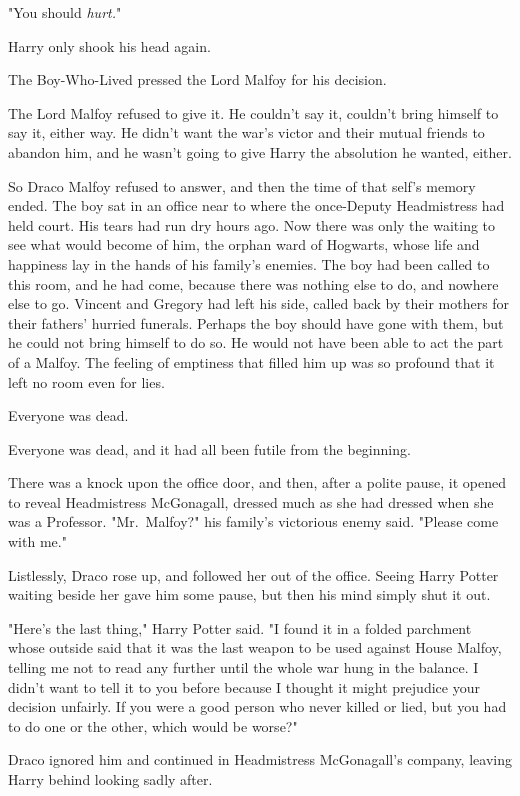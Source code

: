 "You should \emph{hurt.}"

Harry only shook his head again.

The Boy-Who-Lived pressed the Lord Malfoy for his decision.

The Lord Malfoy refused to give it. He couldn't say it, couldn't bring himself
to say it, either way. He didn't want the war's victor and their mutual friends
to abandon him, and he wasn't going to give Harry the absolution he wanted,
either.

So Draco Malfoy refused to answer, and then the time of that self's memory
ended.
\later
The boy sat in an office near to where the once-Deputy Headmistress had held
court. His tears had run dry hours ago. Now there was only the waiting to see
what would become of him, the orphan ward of Hogwarts, whose life and happiness
lay in the hands of his family's enemies. The boy had been called to this room,
and he had come, because there was nothing else to do, and nowhere else to go.
Vincent and Gregory had left his side, called back by their mothers for their
fathers' hurried funerals. Perhaps the boy should have gone with them, but he
could not bring himself to do so. He would not have been able to act the part
of a Malfoy. The feeling of emptiness that filled him up was so profound that
it left no room even for lies.

Everyone was dead.

Everyone was dead, and it had all been futile from the beginning.

There was a knock upon the office door, and then, after a polite pause, it
opened to reveal Headmistress McGonagall, dressed much as she had dressed when
she was a Professor. "Mr.~Malfoy?" his family's victorious enemy said. "Please
come with me."

Listlessly, Draco rose up, and followed her out of the office. Seeing Harry
Potter waiting beside her gave him some pause, but then his mind simply shut it
out.

"Here's the last thing," Harry Potter said. "I found it in a folded parchment
whose outside said that it was the last weapon to be used against House Malfoy,
telling me not to read any further until the whole war hung in the balance. I
didn't want to tell it to you before because I thought it might prejudice your
decision unfairly. If you were a good person who never killed or lied, but you
had to do one or the other, which would be worse?"

Draco ignored him and continued in Headmistress McGonagall's company, leaving
Harry behind looking sadly after.

